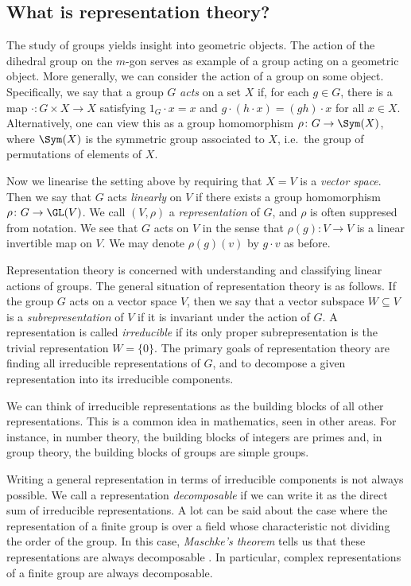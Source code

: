 \documentclass[11pt]{amsart}
\theoremstyle{remark}
\begin{document}

\subsection*{What is representation theory?}
The study of groups yields insight into geometric objects.
The action of the dihedral group on the $m$-gon serves as example of a group acting on a geometric object.
More generally, we can consider the action of a group on some object.
Specifically, we say that a group $G$ \emph{acts} on a set $X$ if, for each $g\in G$, there is a map $\cdot\colon G\times X\to X$ satisfying $1_G\cdot x = x$ and $g\cdot (h\cdot x) = (gh)\cdot x$ for all $x\in X$.
Alternatively, one can view this as a group homomorphism $\rho\colon G\to \Sym(X)$, where $\Sym(X)$ is the symmetric group associated to $X$, i.e.\ the group of permutations of elements of $X$.

Now we linearise the setting above by requiring that $X=V$ is a \emph{vector space}.
Then we say that $G$ acts \emph{linearly} on $V$ if there exists a group homomorphism $\rho\colon G\to \GL(V)$.
We call $(V,\rho)$ a \emph{representation} of $G$, and $\rho$ is often suppresed from notation.
We see that $G$ acts on $V$ in the sense that $\rho(g)\colon V\to V$ is a linear invertible map on $V$.
We may denote $\rho(g)(v)$ by $g\cdot v$ as before.

Representation theory is concerned with understanding and classifying linear actions of groups.
The general situation of representation theory is as follows.
If the group $G$ acts on a vector space $V$, then we say that a vector subspace $W\subseteq V$ is a \emph{subrepresentation} of $V$ if it is invariant under the action of $G$.
A representation is called \emph{irreducible} if its only proper subrepresentation is the trivial representation $W=\{0\}$.
The primary goals of representation theory are finding all irreducible representations of $G$, and to decompose a given representation into its irreducible components.

We can think of irreducible representations as the building blocks of all other representations.
This is a common idea in mathematics, seen in other areas.
For instance, in number theory, the building blocks of integers are primes and, in group theory, the building blocks of groups are simple groups.

Writing a general representation in terms of irreducible components is not always possible.
We call a representation \emph{decomposable} if we can write it as the direct sum of irreducible representations.
A lot can be said about the case where the representation of a finite group is over a field whose characteristic not dividing the order of the group.
In this case, \emph{Maschke's theorem} tells us that these representations are always decomposable \cite{Lang02}.
In particular, complex representations of a finite group are always decomposable.
\end{document}
